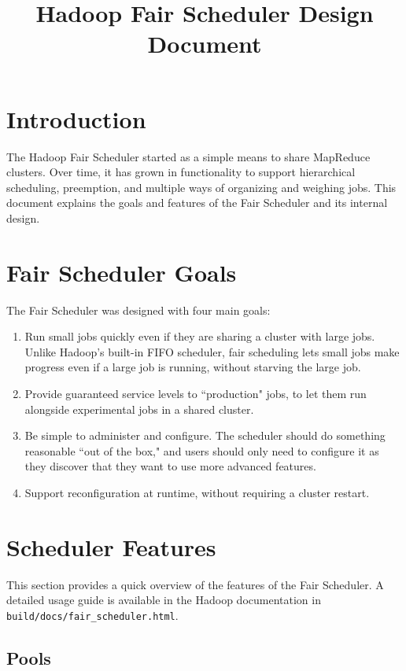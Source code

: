\documentclass[11pt]{article}
\begin{document}
\title{Hadoop Fair Scheduler Design Document}
\author{}
\maketitle
\tableofcontents

\section{Introduction}

The Hadoop Fair Scheduler started as a simple means to share MapReduce clusters. Over time, it has grown in functionality to support hierarchical scheduling, preemption, and multiple ways of organizing and weighing jobs. This document explains the goals and features of the Fair Scheduler and its internal design.

\section{Fair Scheduler Goals}

The Fair Scheduler was designed with four main goals:
\begin{enumerate}
  \item Run small jobs quickly even if they are sharing a cluster with large jobs. Unlike Hadoop's built-in FIFO scheduler, fair scheduling lets small jobs make progress even if a large job is running, without starving the large job.
  \item Provide guaranteed service levels to ``production" jobs, to let them run alongside experimental jobs in a shared cluster.
  \item Be simple to administer and configure. The scheduler should do something reasonable ``out of the box," and users should only need to configure it as they discover that they want to use more advanced features.
  \item Support reconfiguration at runtime, without requiring a cluster restart.
\end{enumerate}

\section{Scheduler Features}

This section provides a quick overview of the features of the Fair Scheduler. A detailed usage guide is available in the Hadoop documentation in {\tt build/docs/fair\_scheduler.html}.

\subsection{Pools}
\end{document}
